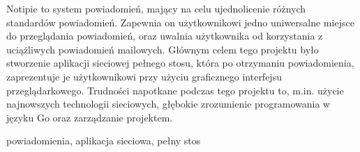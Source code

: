 \secondabstract
Notipie to system powiadomień,
mający na celu ujednolicenie
różnych standardów powiadomień.
Zapewnia on użytkownikowi
jedno uniwersalne miejsce
do przeglądania powiadomień,
oraz uwalnia użytkownika od korzystania
z uciążliwych powiadomień mailowych.
Głównym celem tego projektu
było stworzenie aplikacji sieciowej pełnego stosu,
która po otrzymaniu powiadomienia,
zaprezentuje je użytkownikowi
przy użyciu graficznego interfejsu przeglądarkowego.
Trudności napotkane podczas tego projektu
to, m.in. użycie najnowszych technologii sieciowych,
głębokie zrozumienie programowania w języku Go
oraz zarządzanie projektem.

\secondkeywords powiadomienia, aplikacja sieciowa, pełny stos
